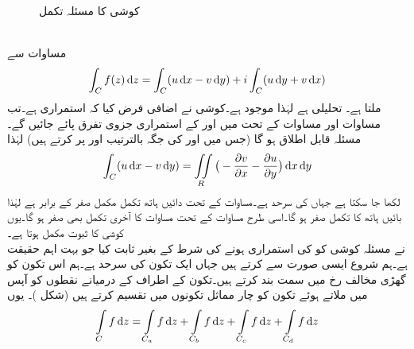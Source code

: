\begin{figure}
\centering
{}
\caption{کوشی کا مسئلہ تکمل}
\label{شکل_مخلوط_تکمل_مسئلہ_کوشی_دائرہ_کار}
\end{figure}
\quad {}\\
مساوات  سے 
\begin{align}\label{مساوت_مخلوط_تکمل_کوشی_تکمل_ثبوت_الف}
\int_C f(z)\dif z=\int_C(u\dif x-v\dif y)+i\int_C(u\dif y+v\dif x)
\end{align}
ملتا ہے۔  تحلیلی ہے لہٰذا  موجود ہے۔کوشی نے اضافی فرض کیا کہ  استمراری ہے۔تب مساوات  اور مساوات   کے تحت  میں  اور  کے استمراری جزوی تفرق پائے جائیں گے۔مسئلہ  قابل اطلاق ہو گا (جس میں  اور  کی جگہ بالترتیب  اور  پر کرتے ہیں) لہٰذا
\begin{align*}
\int_C (u\dif x-v\dif y)=\iint\limits_R \big(-\frac{\partial v}{\partial x}-\frac{\partial u}{\partial y}\big)\dif x\dif y
\end{align*}
لکھا جا سکتا ہے جہاں  کی سرحد  ہے۔مساوات  کے تحت دائیں ہاتھ تکمل مکمل صفر کے برابر ہے لہٰذا بائیں ہاتھ کا تکمل صفر ہو گا۔اسی طرح  مساوات  کے تحت مساوات  کا آخری تکمل بھی صفر ہو گا۔یوں کوشی کا ثبوت مکمل ہوتا ہے۔
\quad {}\\
 نے مسئلہ کوشی کو  کی استمراری ہونے کی شرط کے بغیر ثابت کیا جو بہت اہم حقیقت ہے۔ہم شروع ایسی صورت سے کرتے ہیں جہاں  ایک تکون کی سرحد ہے۔ہم اس تکون کو گھڑی  مخالف     رخ میں  سمت بند کرتے ہیں۔تکون کے اطراف کے درمیانے نقطوں کو آپس میں ملاتے ہوئے تکون کو چار مماثل تکونوں میں تقسیم کرتے ہیں (شکل )۔ یوں 
\begin{align*}
\int\limits_{C}f\dif z=\int\limits_{C_a}f\dif z+\int\limits_{C_b}f\dif z+\int\limits_{C_c}f\dif z+\int\limits_{C_d}f\dif z
\end{align*}
